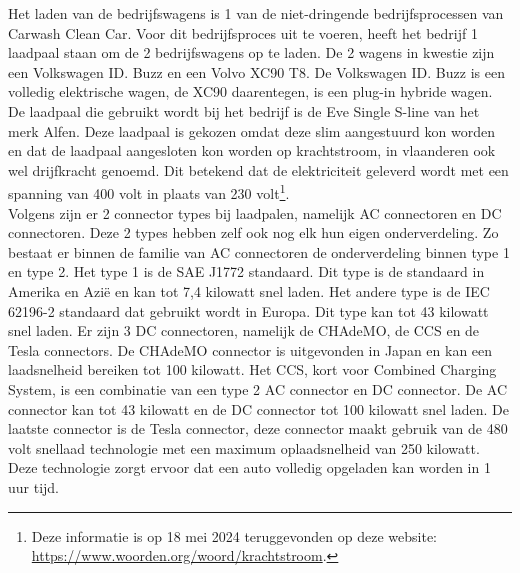 Het laden van de bedrijfswagens is 1 van de niet-dringende bedrijfsprocessen van Carwash Clean Car. Voor dit bedrijfsproces uit te voeren, heeft het bedrijf 1 laadpaal staan om de 2 bedrijfswagens op te laden. De 2 wagens in kwestie zijn een Volkswagen ID. Buzz en een Volvo XC90 T8. De Volkswagen ID. Buzz is een volledig elektrische wagen, de XC90 daarentegen, is een plug-in hybride wagen. De laadpaal die gebruikt wordt bij het bedrijf is de Eve Single S-line van het merk Alfen. Deze laadpaal is gekozen omdat deze slim aangestuurd kon worden en dat de laadpaal aangesloten kon worden op krachtstroom, in vlaanderen ook wel drijfkracht genoemd. Dit betekend dat de elektriciteit geleverd wordt met een spanning van 400 volt in plaats van 230 volt\footnote{Deze informatie is op 18 mei 2024 teruggevonden op deze website: \url{https://www.woorden.org/woord/krachtstroom}.}.\\

Volgens \textcite{HEMAVATHI2022} zijn er 2 connector types bij laadpalen, namelijk AC connectoren en DC connectoren. Deze 2 types hebben zelf ook nog elk hun eigen onderverdeling. Zo bestaat er binnen de familie van AC connectoren de onderverdeling binnen type 1 en type 2. Het type 1 is de SAE J1772 standaard. Dit type is de standaard in Amerika en Azië en kan tot 7,4 kilowatt snel laden. Het andere type is de IEC 62196-2 standaard dat gebruikt wordt in Europa. Dit type kan tot 43 kilowatt snel laden. Er zijn 3 DC connectoren, namelijk de CHAdeMO, de CCS en de Tesla connectors. De CHAdeMO connector is uitgevonden in Japan en kan een laadsnelheid bereiken tot 100 kilowatt. Het CCS, kort voor Combined Charging System, is een combinatie van een type 2 AC connector en DC connector. De AC connector kan tot 43 kilowatt en de DC connector tot 100 kilowatt snel laden. De laatste connector is de Tesla connector, deze connector maakt gebruik van de 480 volt snellaad technologie met een maximum oplaadsnelheid van 250 kilowatt. Deze technologie zorgt ervoor dat een auto volledig opgeladen kan worden in 1 uur tijd. \\

